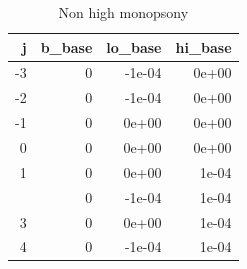 \begin{table}

\caption{Non high monopsony}
\centering
\begin{tabular}[t]{rrrr}
\toprule
j & b\_base & lo\_base & hi\_base\\
\midrule
-3 & 0 & -1e-04 & 0e+00\\
-2 & 0 & -1e-04 & 0e+00\\
-1 & 0 & 0e+00 & 0e+00\\
0 & 0 & 0e+00 & 0e+00\\
1 & 0 & 0e+00 & 1e-04\\
\addlinespace
2 & 0 & -1e-04 & 1e-04\\
3 & 0 & 0e+00 & 1e-04\\
4 & 0 & -1e-04 & 1e-04\\
\bottomrule
\end{tabular}
\end{table}
